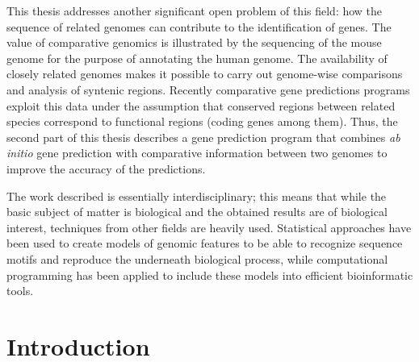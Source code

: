 This thesis addresses another significant open problem of this field:
how the sequence of related genomes can contribute to the
identification of genes. The value of comparative genomics is
illustrated by the sequencing of the mouse genome for the purpose of
annotating the human genome. The availability of closely related
genomes makes it possible to carry out genome-wise comparisons and
analysis of syntenic regions. Recently comparative gene predictions
programs exploit this data under the assumption that conserved regions
between related species correspond to functional regions (coding genes
among them). Thus, the second part of this thesis describes a gene
prediction program that combines \textit{ab initio} gene prediction
with comparative information between two genomes to improve the
accuracy of the predictions.

The work described is essentially interdisciplinary; this means that
while the basic subject of matter is biological and the obtained
results are of biological interest, techniques from other fields are
heavily used. Statistical approaches have been used to create models
of genomic features to be able to recognize sequence motifs and
reproduce the underneath biological process, while computational
programming has been applied to include these models into efficient
bioinformatic tools.

\clearemptydoublepage


\pagestyle{fancy}
\renewcommand{\sectionmark}[1]{\markboth{}{\thesection.\ #1}}
\renewcommand{\subsectionmark}[1]{\markboth{}{\thesubsection.\ \textsl{#1}}}

{\setlength{\parskip}{0.4ex plus0.2ex minus0.2ex} %

\tableofcontents}

\vfill



\clearemptydoublepage

\newpage
{}
\setcounter{page}{1}


\chapter{Introduction}

